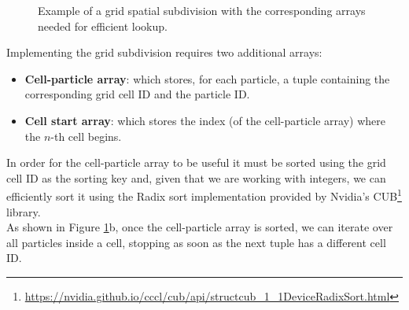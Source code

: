 \begin{figure}[ht!]
    \centering
    \hspace{.2in}
        \hspace{.2in}
        \hspace{.3in}
    \caption{Example of a grid spatial subdivision with the corresponding arrays needed for efficient lookup.}\label{fig:gridPic}
\end{figure}
\noindent
Implementing the grid subdivision requires two additional arrays:
\begin{itemize}
    \item \textbf{Cell-particle array}: which stores, for each particle, a tuple containing the corresponding grid cell ID and the particle ID.
    \item \textbf{Cell start array}: which stores the index (of the cell-particle array) where the $n$-th cell begins. 
\end{itemize}
\noindent
In order for the cell-particle array to be useful it must be sorted using the grid cell ID as the sorting key and, given that we are working with integers, we can efficiently sort it using the Radix sort implementation provided by Nvidia's CUB\footnote{\url{https://nvidia.github.io/cccl/cub/api/structcub_1_1DeviceRadixSort.html}} library.\\
As shown in Figure \ref{fig:gridPic}b, once the cell-particle array is sorted, we can iterate over all particles inside a cell, stopping as soon as the next tuple has a different cell ID.\\

